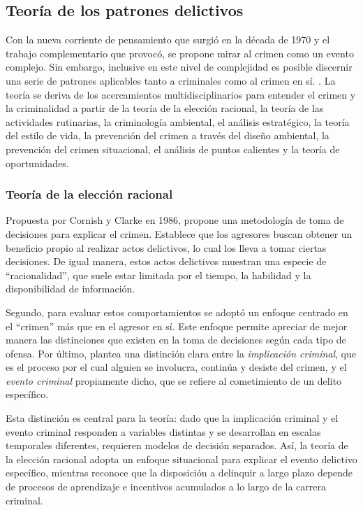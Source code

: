 \subsection{Teoría de los patrones delictivos}
Con la nueva corriente de pensamiento que surgió en la década de 1970 y el trabajo complementario que provocó, se propone mirar al crimen como un evento complejo. Sin embargo, inclusive en este nivel de complejidad es posible discernir una serie de patrones aplicables tanto a criminales como al crimen en sí. \cite[p.~266]{brantingham1993}. La teoría se deriva de los acercamientos multidisciplinarios para entender el crimen y la criminalidad a partir de la teoría de la elección racional, la teoría de las actividades rutinarias, la criminología ambiental, el análisis estratégico, la teoría del estilo de vida, la prevención del crimen a través del diseño ambiental, la prevención del crimen situacional, el análisis de puntos calientes y la teoría de oportunidades\cite[p.~284]{brantingham1993}.

\subsubsection{Teoría de la elección racional}
Propuesta por Cornish y Clarke en 1986, propone una metodología de toma de decisiones para explicar el crimen. Establece que los agresores buscan obtener un beneficio propio al realizar actos delictivos, lo cual los lleva a tomar ciertas decisiones. De igual manera, estos actos delictivos muestran una especie de ``racionalidad'', que suele estar limitada por el tiempo, la habilidad y la disponibilidad de información\cite{cornish1986}.

Segundo, para evaluar estos comportamientos se adoptó un enfoque centrado en el ``crimen'' más que en el agresor en sí. Este enfoque permite apreciar de mejor manera las distinciones que existen en la toma de decisiones según cada tipo de ofensa. Por último, plantea una distinción clara entre la \textit{implicación criminal}, que es el proceso por el cual alguien se involucra, continúa y desiste del crimen, y el \textit{evento criminal} propiamente dicho, que se refiere al cometimiento de un delito específico\cite{cornish1986}.

Esta distinción es central para la teoría: dado que la implicación criminal y el evento criminal responden a variables distintas y se desarrollan en escalas temporales diferentes, requieren modelos de decisión separados. Así, la teoría de la elección racional adopta un enfoque situacional para explicar el evento delictivo específico, mientras reconoce que la disposición a delinquir a largo plazo depende de procesos de aprendizaje e incentivos acumulados a lo largo de la carrera criminal.

